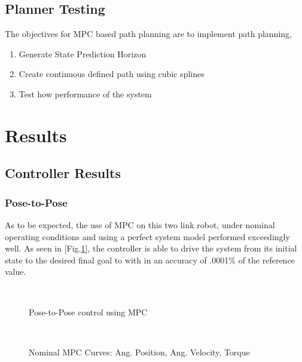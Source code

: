 \documentclass[journal]{IEEEtran}
\begin{document}
\subsection{Planner Testing}

The objectives for MPC based path planning are to implement path planning,


\begin{enumerate}
    \item Generate State Prediction Horizon
    \item Create continuous defined path using cubic splines
    \item Test how performance of the system
\end{enumerate}


\section{Results}
\subsection{Controller Results}

\subsubsection{Pose-to-Pose}

As to be expected, the use of MPC on this two link robot, under nominal operating conditions and using a perfect system model performed exceedingly well. As seen in [Fig.\ref{fig:pose2pose}], the controller is able to drive the system from its initial state to the desired final goal to with in an accuracy of .0001\% of the reference value.

\begin{figure}[hb]%
    \centering
    \qquad
    \\
    \qquad
    \caption{Pose-to-Pose control using MPC}%
    \label{fig:pose2pose}%
\end{figure}

\begin{figure}[ht]%
    \centering
    \qquad
    \\
    \caption{Nominal MPC Curves: Ang. Position, Ang. Velocity, Torque}%
    \label{fig:pose2pose_control_action}%
\end{figure}
\end{document}
